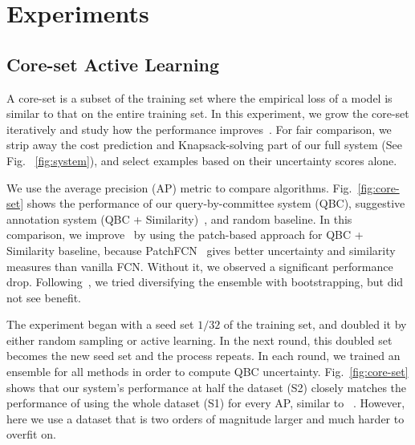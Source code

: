 \documentclass{llncs}
\begin{document}
\section{Experiments}
\vspace*{-0.05cm}

\subsection{Core-set Active Learning}
\vspace*{-0.05cm}
A core-set is a subset of the training set where the empirical loss of a model is similar to that on the entire training set. In this experiment, we grow the core-set iteratively and study how the performance improves~\cite{yang2017suggestive,sener2018active}. For fair comparison, we strip away the cost prediction and Knapsack-solving part of our full system (See Fig. ~\ref{fig:system}), and select examples based on their uncertainty scores alone. 

We use the average precision (AP) metric to compare algorithms. Fig.~\ref{fig:core-set} shows the performance of our query-by-committee system (QBC), suggestive annotation system (QBC + Similarity)~\cite{yang2017suggestive}, and random baseline. In this comparison, we improve~\cite{yang2017suggestive} by using the patch-based approach for QBC + Similarity baseline, because PatchFCN~\cite{arxiv2018PatchFCN} gives better uncertainty and similarity measures than vanilla FCN. Without it, we observed a significant performance drop. Following~\cite{yang2017suggestive}, we tried diversifying the ensemble with bootstrapping, but did not see benefit. 

The experiment began with a seed set $1/32$ of the training set, and doubled it by either random sampling or active learning. In the next round, this doubled set becomes the new seed set and the process repeats. In each round, we trained an ensemble for all methods in order to compute QBC uncertainty. Fig.~\ref{fig:core-set} shows that our system's performance at half the dataset (S2) closely matches the performance of using the whole dataset (S1) for every AP, similar to ~\cite{yang2017suggestive,sener2018active}. However, here we use a dataset that is two orders of magnitude larger and much harder to overfit on. 
\end{document}
